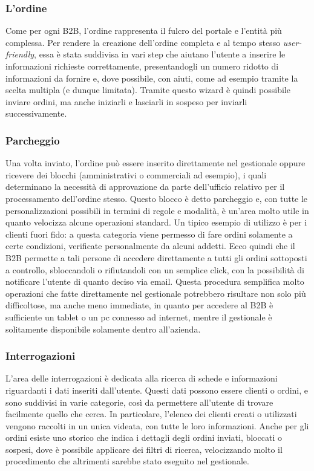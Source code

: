 \subsubsection{L'ordine}
Come per ogni B2B, l'ordine rappresenta il fulcro del portale e l'entità più complessa. Per rendere la creazione dell'ordine completa e al tempo stesso \textit{user-friendly}, essa è stata suddivisa in vari step che aiutano l'utente a inserire le informazioni richieste correttamente, presentandogli un numero ridotto di informazioni da fornire e, dove possibile, con aiuti, come ad esempio tramite la scelta multipla (e dunque limitata). Tramite questo \gls{wizard} è quindi possibile inviare ordini, ma anche iniziarli e lasciarli in sospeso per inviarli successivamente.

\subsubsection{Parcheggio}
Una volta inviato, l'ordine può essere inserito direttamente nel gestionale oppure ricevere dei blocchi (amministrativi o commerciali ad esempio), i quali determinano la necessità di approvazione da parte dell'ufficio relativo per il processamento dell'ordine stesso. Questo blocco è detto parcheggio e, con tutte le personalizzazioni possibili in termini di regole e modalità, è un'area molto utile in quanto velocizza alcune operazioni standard. Un tipico esempio di utilizzo è per i clienti fuori fido: a questa categoria viene permesso di fare ordini solamente a certe condizioni, verificate personalmente da alcuni addetti. Ecco quindi che il B2B permette a tali persone di accedere direttamente a tutti gli ordini sottoposti a controllo, sbloccandoli o rifiutandoli con un semplice click, con la possibilità di notificare l'utente di quanto deciso via email. Questa procedura semplifica molto operazioni che fatte direttamente nel gestionale potrebbero risultare non solo più difficoltose, ma anche meno immediate, in quanto per accedere al B2B è sufficiente un tablet o un pc connesso ad internet, mentre il gestionale è solitamente disponibile solamente dentro all'azienda.

\subsubsection{Interrogazioni}
L'area delle interrogazioni è dedicata alla ricerca di schede e informazioni riguardanti i dati inseriti dall'utente. Questi dati possono essere clienti o ordini, e sono suddivisi in varie categorie, così da permettere all'utente di trovare facilmente quello che cerca. In particolare, l'elenco dei clienti creati o utilizzati vengono raccolti in un unica videata, con tutte le loro informazioni. Anche per gli ordini esiste uno storico che indica i dettagli degli ordini inviati, bloccati o sospesi, dove è possibile applicare dei filtri di ricerca, velocizzando molto il procedimento che altrimenti sarebbe stato eseguito nel gestionale.

